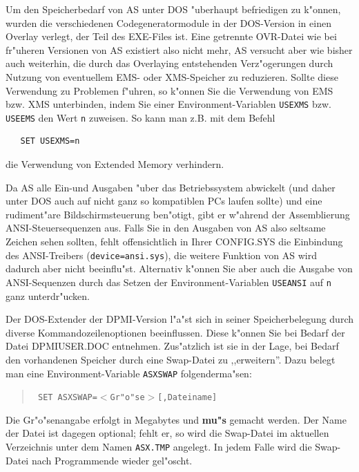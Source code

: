 \documentclass[12pt,a4paper,twoside]{report}
\newcommand{\bb}[1]{{\bf #1}}
\newcommand{\tty}[1]{{\tt #1}}
\newcommand{\asname}{AS}
\begin{document}
Um den  Speicherbedarf von \asname{} unter DOS "uberhaupt
befriedigen zu k"onnen, wurden die verschiedenen Codegeneratormodule in
der DOS-Version in einen Overlay verlegt, der Teil des EXE-Files ist.
Eine getrennte OVR-Datei wie bei fr"uheren Versionen von \asname{} existiert also
nicht mehr, \asname{} versucht aber wie bisher auch weiterhin, die durch das
Overlaying entstehenden Verz"ogerungen durch Nutzung von eventuellem EMS-
oder XMS-Speicher zu reduzieren.  Sollte diese Verwendung zu Problemen
f"uhren, so k"onnen Sie die Verwendung von EMS bzw. XMS unterbinden, indem
Sie einer Environment-Variablen \tty{USEXMS} bzw. \tty{USEEMS} den Wert
\tty{n} zuweisen.  So kann man z.B. mit dem Befehl
\begin{verbatim}
   SET USEXMS=n
\end{verbatim}
die Verwendung von Extended Memory verhindern.
\par
Da \asname{} alle Ein-und Ausgaben "uber das Betriebssystem abwickelt (und daher
unter DOS auch auf nicht ganz so kompatiblen PCs laufen sollte) und eine
rudiment"are Bildschirmsteuerung ben"otigt, gibt er w"ahrend der
Assemblierung ANSI-Steuersequenzen aus.
Falls Sie in den Ausgaben von \asname{}  also seltsame
Zeichen sehen sollten, fehlt offensichtlich in Ihrer CONFIG.SYS die
Einbindung des ANSI-Trei\-bers (\tty{device=\-ansi.sys}), die weitere Funktion
von \asname{}  wird dadurch aber nicht beeinflu"st. Alternativ
k"onnen Sie aber auch die Ausgabe von ANSI-Sequenzen durch das Setzen der
Environment-Variablen \tty{USEANSI} auf \tty{n} ganz unterdr"ucken.

Der DOS-Extender der DPMI-Version  l"a"st sich in
seiner Speicherbelegung durch diverse Kommandozeilenoptionen beeinflussen.
Diese k"onnen Sie bei Bedarf der Datei DPMIUSER.DOC entnehmen.
Zus"atzlich ist sie in der Lage, bei Bedarf den vorhandenen Speicher
durch eine Swap-Datei zu ,,erweitern''.  Dazu belegt man eine
Environment-Variable \tty{ASXSWAP} folgenderma"sen:
\begin{quote}{\tt
  SET ASXSWAP=$<$Gr"o"se$>$[,Dateiname]
}\end{quote}
Die Gr"o"senangabe erfolgt in Megabytes und \bb{mu"s} gemacht werden.  Der
Name der Datei ist dagegen optional; fehlt er, so wird die Swap-Datei im
aktuellen Verzeichnis unter dem Namen \tty{ASX.TMP} angelegt.  In jedem
Falle wird die Swap-Datei nach Programmende wieder gel"oscht.
\end{document}

